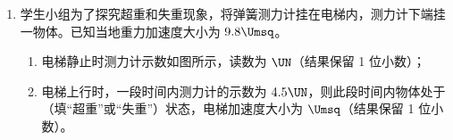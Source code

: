 \documentclass[\gkver]{gaokaozhenti}
\begin{document}
\begin{enumerate}
{对滑块　$T - mg = ma$

其中　$F_{\text{安}} = \frac{B^{2}L^{2}v}{R}$

即　$\frac{B^{2}L^{2}v}{R} + (M - m)g = (M + m)a$

线圈向上做减速运动，随速度的减小，向下的加速度减小；当加速度为零时，即线圈匀速运动的速度为

$v_{0} = \frac{(M - m)gR}{B^{2}L^{2}}$

A．若线圈进入磁场时的速度较小，则线圈进入磁场时做加速度减小的减速运动，线圈的速度和加速度都趋近于零，则图像 A 可能正确；

B．因 $t = 0$ 时刻线圈就进入磁场，则进入磁场时线圈向上不可能做匀减速运动，则图像 B 不可能；

CD．若线圈的质量等于物块的质量，且当线圈进入磁场时，且速度大于 $v_{0}$，线圈进入磁场做加速度减小的减速运动，完全进入磁场后线圈做匀速运动；当线圈出离磁场时，受向下的安培力又做加速度减小的减速运动，最终出离磁场时做匀速运动，则图像 C 有可能，D 不可能。

故选 AC。
}

\item
学生小组为了探究超重和失重现象，将弹簧测力计挂在电梯内，测力计下端挂一物体。已知当地重力加速度大小为 $9.8 \Umsq$。
\begin{enumerate}
	\item
	电梯静止时测力计示数如图所示，读数为 $\UN$（结果保留 1 位小数）；
	\item
	电梯上行时，一段时间内测力计的示数为 $4.5 \UN$，则此段时间内物体处于（填“超重”或“失重”）状态，电梯加速度大小为 $\Umsq$（结果保留 1 位小数）。
\end{enumerate}




\end{enumerate}
\end{document}
